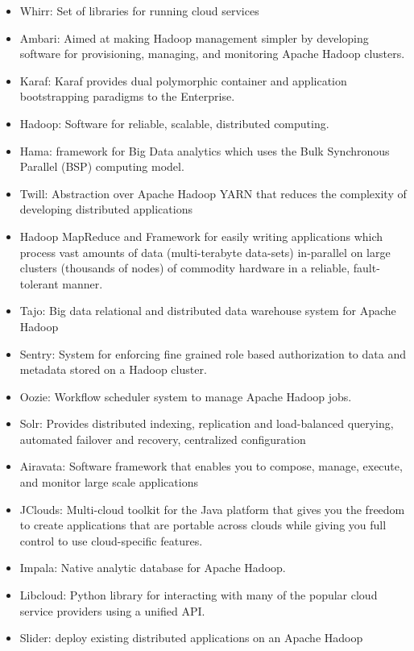 \documentclass[12pt]{report}
\providecommand{\tightlist}{%
  \setlength{\itemsep}{0pt}\setlength{\parskip}{0pt}}
\begin{document}
\begin{itemize}
\tightlist
\item
  Whirr: Set of libraries for running cloud services
\item
  Ambari: Aimed at making Hadoop management simpler by developing
  software for provisioning, managing, and monitoring Apache Hadoop
  clusters.
\item
  Karaf: Karaf provides dual polymorphic container and application
  bootstrapping paradigms to the Enterprise.
\item
  Hadoop: Software for reliable, scalable, distributed computing.
\item
  Hama: framework for Big Data analytics which uses the Bulk Synchronous
  Parallel (BSP) computing model.
\item
  Twill: Abstraction over Apache Hadoop YARN that reduces the complexity
  of developing distributed applications
\item
  Hadoop MapReduce and Framework for easily writing applications which
  process vast amounts of data (multi-terabyte data-sets) in-parallel on
  large clusters (thousands of nodes) of commodity hardware in a
  reliable, fault-tolerant manner.
\item
  Tajo: Big data relational and distributed data warehouse system for
  Apache Hadoop
\item
  Sentry: System for enforcing fine grained role based authorization to
  data and metadata stored on a Hadoop cluster.
\item
  Oozie: Workflow scheduler system to manage Apache Hadoop jobs.
\item
  Solr: Provides distributed indexing, replication and load-balanced
  querying, automated failover and recovery, centralized configuration
\item
  Airavata: Software framework that enables you to compose, manage,
  execute, and monitor large scale applications
\item
  JClouds: Multi-cloud toolkit for the Java platform that gives you the
  freedom to create applications that are portable across clouds while
  giving you full control to use cloud-specific features.
\item
  Impala: Native analytic database for Apache Hadoop.
\item
  Libcloud: Python library for interacting with many of the popular
  cloud service providers using a unified API.
\item
  Slider: deploy existing distributed applications on an Apache Hadoop

\end{itemize}
\end{document}
